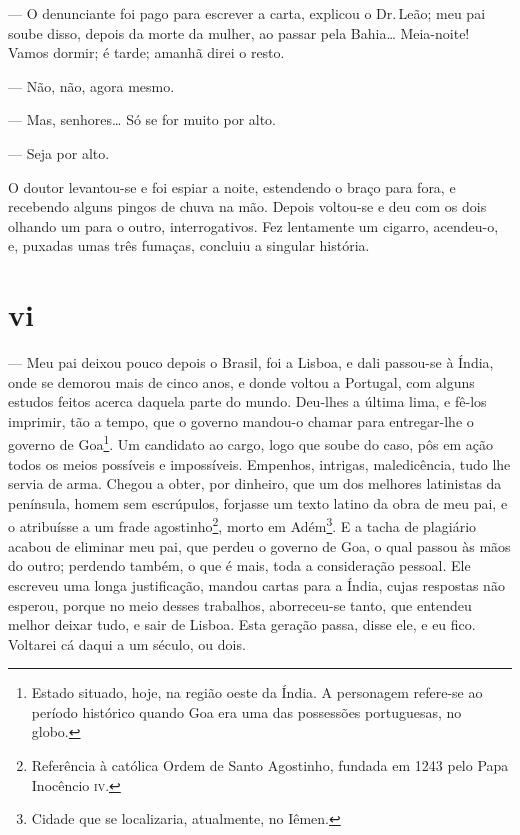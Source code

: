 --- O denunciante foi pago para escrever a carta, explicou o Dr.\,Leão;
meu pai soube disso, depois da morte da mulher, ao passar pela Bahia\ldots{}
Meia-noite! Vamos dormir; é tarde; amanhã direi o resto.

--- Não, não, agora mesmo.

--- Mas, senhores\ldots{} Só se for muito por alto.

--- Seja por alto.

O doutor levantou-se e foi espiar a noite, estendendo o braço para fora,
e recebendo alguns pingos de chuva na mão. Depois voltou-se e deu com os
dois olhando um para o outro, interrogativos. Fez lentamente um cigarro,
acendeu-o, e, puxadas umas três fumaças, concluiu a singular história.





\section{vi}



--- Meu pai deixou pouco depois o Brasil, foi a Lisboa, e dali passou-se
à Índia, onde se demorou mais de cinco anos, e donde voltou a Portugal,
com alguns estudos feitos acerca daquela parte do mundo. Deu-lhes a
última lima, e fê-los imprimir, tão a tempo, que o governo mandou-o
chamar para entregar-lhe o governo de Goa\footnote{Estado situado, hoje,
  na região oeste da Índia. A personagem refere-se ao período histórico
  quando Goa era uma das possessões portuguesas, no globo.}. Um
candidato ao cargo, logo que soube do caso, pôs em ação todos os meios
possíveis e impossíveis. Empenhos, intrigas, maledicência, tudo lhe
servia de arma. Chegou a obter, por dinheiro, que um dos melhores
latinistas da península, homem sem escrúpulos, forjasse um texto latino
da obra de meu pai, e o atribuísse a um frade agostinho\footnote{Referência
  à católica Ordem de Santo Agostinho, fundada em 1243 pelo Papa
  Inocêncio \textsc{iv}.}, morto em Adém\footnote{Cidade que se localizaria,
  atualmente, no Iêmen.}. E a tacha de plagiário acabou de eliminar meu
pai, que perdeu o governo de Goa, o qual passou às mãos do outro;
perdendo também, o que é mais, toda a consideração pessoal. Ele escreveu
uma longa justificação, mandou cartas para a Índia, cujas respostas não
esperou, porque no meio desses trabalhos, aborreceu-se tanto, que
entendeu melhor deixar tudo, e sair de Lisboa. Esta geração passa, disse
ele, e eu fico. Voltarei cá daqui a um século, ou dois.

